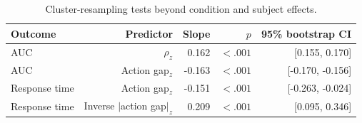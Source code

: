 \begin{table}[htbp]
\centering
\caption{Cluster-resampling tests beyond condition and subject effects.}
\label{tab:cluster-regression}
\begin{tabular}{l r r r r}
\toprule
Outcome & Predictor & Slope & $p$ & 95\% bootstrap CI \\
\midrule
AUC & $\rho_z$ & 0.162 & $<.001$ & [0.155, 0.170] \\
AUC & Action gap$_z$ & -0.163 & $<.001$ & [-0.170, -0.156] \\
Response time & Action gap$_z$ & -0.151 & $<.001$ & [-0.263, -0.024] \\
Response time & Inverse $|$action gap$|_z$ & 0.209 & $<.001$ & [0.095, 0.346] \\
\bottomrule
\end{tabular}
\end{table}
